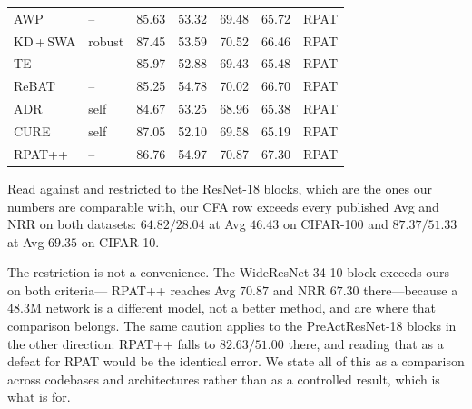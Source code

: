 \documentclass{article} %
\theoremstyle{plain}
\begin{document}
\begin{table}[!htbp]
\begin{tabular}{llrrrrl}
    AWP \citep{2020_awp}      & --      & 85.63 & 53.32 & 69.48 & 65.72 & RPAT \\
    KD\,+\,SWA \citep{kdswa}   & robust  & 87.45 & 53.59 & 70.52 & 66.46 & RPAT \\
    TE \citep{te}             & --      & 85.97 & 52.88 & 69.43 & 65.48 & RPAT \\
    ReBAT \citep{rebat}       & --      & 85.25 & 54.78 & 70.02 & 66.70 & RPAT \\
    ADR \citep{adr}           & self    & 84.67 & 53.25 & 68.96 & 65.38 & RPAT \\
    CURE \citep{cure}         & self    & 87.05 & 52.10 & 69.58 & 65.19 & RPAT \\
    RPAT++ \citep{rpat}       & --      & 86.76 & 54.97 & 70.87 & 67.30 & RPAT \\
    \bottomrule
  \end{tabular}
\end{table}

Read against  and restricted to the ResNet-18 blocks, which are the ones our numbers
are comparable with, our CFA row exceeds every published Avg and NRR on both datasets: $64.82/28.04$
at Avg $46.43$ on CIFAR-100 and $87.37/51.33$ at Avg $69.35$ on CIFAR-10.

The restriction is not a convenience. The WideResNet-34-10 block exceeds ours on both criteria---
RPAT++ reaches Avg $70.87$ and NRR $67.30$ there---because a $48.3$M network is a different model, not
a better method, and  are where that comparison belongs. The same caution applies to the
PreActResNet-18 blocks in the other direction: RPAT++ falls to $82.63/51.00$ there, and reading that
as a defeat for RPAT would be the identical error. We state all of this as a comparison across
codebases and architectures rather than as a controlled result, which is what  is for.
\end{document}
